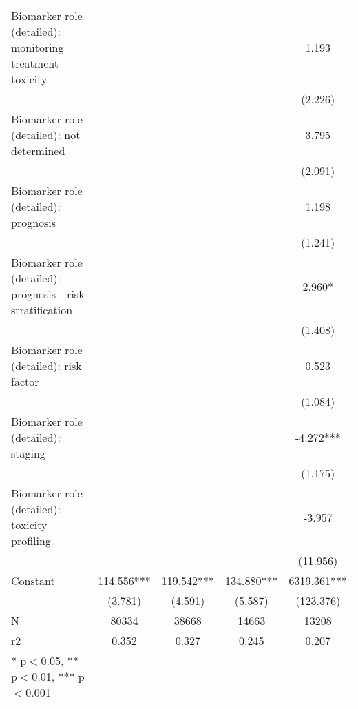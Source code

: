 \begin{table}[htb]
\begin{tabular}{l*{4}c}
Biomarker role (detailed): monitoring treatment toxicity&               &               &               &       1.193   \\
                    &               &               &               &     (2.226)   \\
Biomarker role (detailed): not determined&               &               &               &       3.795   \\
                    &               &               &               &     (2.091)   \\
Biomarker role (detailed): prognosis&               &               &               &       1.198   \\
                    &               &               &               &     (1.241)   \\
Biomarker role (detailed): prognosis - risk stratification&               &               &               &       2.960*  \\
                    &               &               &               &     (1.408)   \\
Biomarker role (detailed): risk factor&               &               &               &       0.523   \\
                    &               &               &               &     (1.084)   \\
Biomarker role (detailed): staging&               &               &               &      -4.272***\\
                    &               &               &               &     (1.175)   \\
Biomarker role (detailed): toxicity profiling&               &               &               &      -3.957   \\
                    &               &               &               &    (11.956)   \\
Constant            &     114.556***&     119.542***&     134.880***&    6319.361***\\
                    &     (3.781)   &     (4.591)   &     (5.587)   &   (123.376)   \\
N                   &       80334   &       38668   &       14663   &       13208   \\
r2                  &       0.352   &       0.327   &       0.245   &       0.207   \\
* p$<$0.05, ** p$<$0.01, *** p$<$0.001 \\

\end{tabular}
\end{table}


